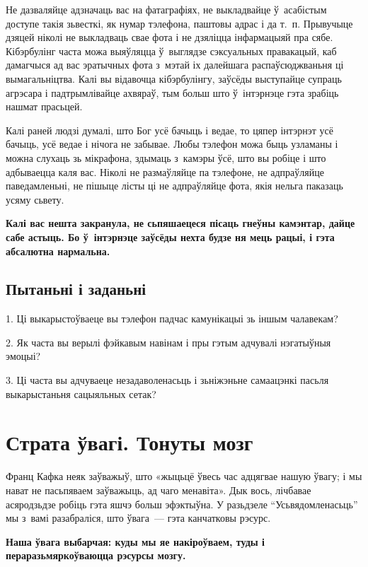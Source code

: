 Не дазваляйце адзначаць вас на фатаграфіях, не выкладвайце ў~асабістым доступе такія зьвесткі, як нумар тэлефона, паштовы адрас і да т.~п. Прывучыце дзяцей ніколі не выкладваць свае фота і не дзяліцца інфармацыяй пра сябе. Кібэрбулінг часта можа выяўляцца ў~выглядзе сэксуальных правакацый, каб дамагчыся ад вас эратычных фота з~мэтай іх далейшага распаўсюджваньня ці вымагальніцтва. Калі вы відавочца кібэрбулінгу, заўсёды выступайце супраць агрэсара і падтрымлівайце ахвяраў, тым больш што ў~інтэрнэце гэта зрабіць нашмат прасьцей.

Калі раней людзі думалі, што Бог усё бачыць і ведае, то цяпер інтэрнэт усё бачыць, усё ведае і нічога не забывае. Любы тэлефон можа быць узламаны і можна слухаць зь мікрафона, здымаць з~камэры ўсё, што вы робіце і што адбываецца каля вас. Ніколі не размаўляйце па тэлефоне, не адпраўляйце паведамленьні, не пішыце лісты ці не адпраўляйце фота, якія нельга паказаць усяму сьвету.

\textbf{Калі вас нешта закранула, не сьпяшаецеся пісаць гнеўны камэнтар, дайце сабе астыць. Бо ў~інтэрнэце заўсёды нехта будзе ня мець рацыі, і гэта абсалютна нармальна.}

\subsection*{Пытаньні і заданьні}

1. Ці выкарыстоўваеце вы тэлефон падчас камунікацыі зь іншым чалавекам?

2. Як часта вы верылі фэйкавым навінам і пры гэтым адчувалі нэгатыўныя эмоцыі?

3. Ці часта вы адчуваеце незадаволенасьць і зьніжэньне самаацэнкі пасьля выкарыстаньня сацыяльных сетак?


\section{Страта ўвагі. Тонуты мозг}

Франц Кафка неяк заўважыў, што «жыцьцё ўвесь час адцягвае нашую ўвагу; і мы нават не пасьпяваем заўважыць, ад чаго менавіта». Дык вось, лічбавае асяродзьдзе робіць гэта яшчэ больш эфэктыўна. У разьдзеле ``Усьвядомленасьць'' мы з~вамі разабраліся, што ўвага~--- гэта канчатковы рэсурс.

\textbf{Наша ўвага выбарчая: куды мы яе накіроўваем, туды і пераразьмяркоўваюцца рэсурсы мозгу.}


